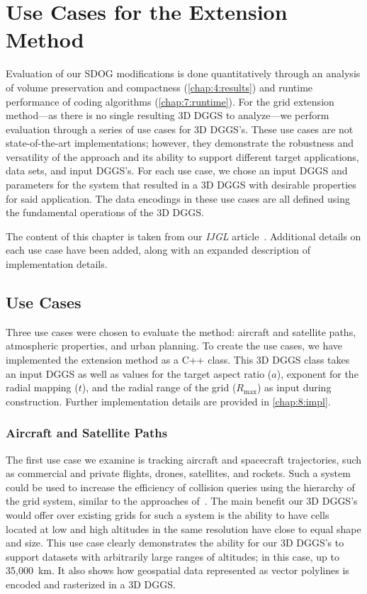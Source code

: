 \chapter{Use Cases for the Extension Method} \label{chap:usecases}
Evaluation of our SDOG modifications is done quantitatively through an analysis of volume preservation and compactness (\cref{chap:4:results}) and runtime performance of coding algorithms (\cref{chap:7:runtime}).
For the grid extension method---as there is no single resulting 3D DGGS to analyze---we perform evaluation through a series of use cases for 3D DGGS's.
These use cases are not state-of-the-art implementations; however, they demonstrate the robustness and versatility of the approach and its ability to support different target applications, data sets, and input DGGS's.
For each use case, we chose an input DGGS and parameters for the system that resulted in a 3D DGGS with desirable properties for said application.
The data encodings in these use cases are all defined using the fundamental operations of the 3D DGGS.


The content of this chapter is taken from our \textit{IJGL} article~\cite{ulmer2020general}.
Additional details on each use case have been added, along with an expanded description of implementation details.


\section{Use Cases}
Three use cases were chosen to evaluate the method: aircraft and satellite paths, atmospheric properties, and urban planning.
To create the use cases, we have implemented the extension method as a C++ class.
This 3D DGGS class takes an input DGGS as well as values for the target aspect ratio ($a$), exponent for the radial mapping ($t$), and the radial range of the grid ($R_\mathrm{max}$) as input during construction.
Further implementation details are provided in \cref{chap:8:impl}.


\subsection{Aircraft and Satellite Paths} \label{chap:8:sats}
The first use case we examine is tracking aircraft and spacecraft trajectories, such as commercial and private flights, drones, satellites, and rockets.
Such a system could be used to increase the efficiency of collision queries using the hierarchy of the grid system, similar to the approaches of~\cite{miao2019low, zhai2019collision}.
The main benefit our 3D DGGS's would offer over existing grids for such a system is the ability to have cells located at low and high altitudes in the same resolution have close to equal shape and size.
This use case clearly demonstrates the ability for our 3D DGGS's to support datasets with arbitrarily large ranges of altitudes; in this case, up to 35,000~km.
It also shows how geospatial data represented as vector polylines is encoded and rasterized in a 3D DGGS.


